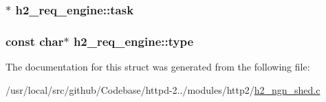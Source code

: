 \subsubsection[{\texorpdfstring{task}{task}}]{$\ast$ h2\+\_\+req\+\_\+engine\+::task}\hypertarget{structh2__req__engine_ad4cb93af13328ad6a87f083545d1e990}{}\label{structh2__req__engine_ad4cb93af13328ad6a87f083545d1e990}
\subsubsection[{\texorpdfstring{type}{type}}]{\setlength{\rightskip}{0pt plus 5cm}const char$\ast$ h2\+\_\+req\+\_\+engine\+::type}\hypertarget{structh2__req__engine_aff1ecf309446554dfc0d1f5a83a3906c}{}\label{structh2__req__engine_aff1ecf309446554dfc0d1f5a83a3906c}


The documentation for this struct was generated from the following file\+:\begin{DoxyCompactItemize}
\item 
/usr/local/src/github/\+Codebase/httpd-\/2../modules/http2/\hyperlink{h2__ngn__shed_8c}{h2\+\_\+ngn\+\_\+shed.\+c}\end{DoxyCompactItemize}
